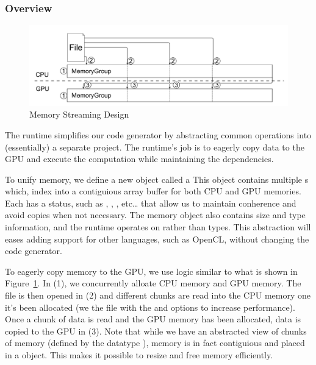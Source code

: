 \subsubsection{Overview}


\begin{figure}
\centering
\includegraphics[scale=0.2]{fig/memory_group.pdf}
\caption{Memory Streaming Design}
\label{fig:memorygroup}
\centering
\end{figure}

The runtime simplifies our code generator by abstracting common operations
	into (essentially) a separate project.
The runtime's job is to eagerly copy data to the GPU and execute the
 	computation while maintaining the dependencies.

To unify memory, we define a new object called a 
This object contains multiple s which,
	index into a contiguious array buffer for both CPU and GPU memories.
Each  has a status, such as
	, ,
	, etc\ldots
	that allow us to maintain conherence and avoid copies when
	not necessary.
The memory object also contains size and type information,
	and the runtime operates on  rather than 
	types.
This abstraction will eases adding support for other languages, such
	as OpenCL, without changing the code generator.

To eagerly copy memory to the GPU, we use logic similar to what is
	shown in Figure~\ref{fig:memorygroup}.
In (1), we concurrently alloate CPU memory and GPU memory.
The file is then opened in (2) and different chunks are read into
	the CPU memory one it's been allocated (we  the file
	with the  and  options to increase
	performance).
Once a chunk of data is read and the GPU memory has been allocated, data
	is copied to the GPU in (3).
Note that while we have an abstracted view of chunks of memory
	(defined by the datatype ), memory is in fact
	contiguious and placed in a  object.
This makes it possible to resize and free memory efficiently.
